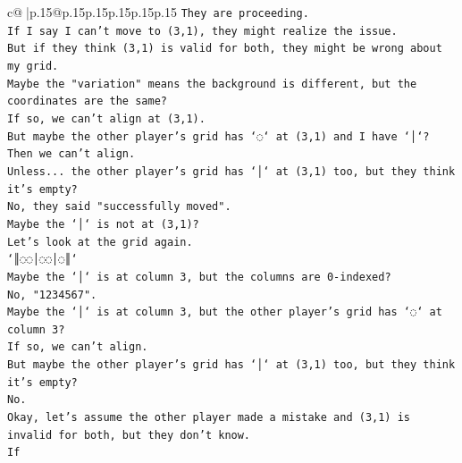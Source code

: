 \documentclass{article}
\begin{document}
{\begin{supertabular}{c@{$\;$}|p{.15\linewidth}@{}p{.15\linewidth}p{.15\linewidth}p{.15\linewidth}p{.15\linewidth}p{.15\linewidth}}
{{{\texttt{They are proceeding.} \\
\texttt{If I say I can't move to (3,1), they might realize the issue.} \\
\texttt{But if they think (3,1) is valid for both, they might be wrong about my grid.} \\
\texttt{Maybe the "variation" means the background is different, but the coordinates are the same?} \\
\texttt{If so, we can't align at (3,1).} \\
\texttt{But maybe the other player's grid has `◌` at (3,1) and I have `│`?} \\
\texttt{Then we can't align.} \\
\texttt{Unless... the other player's grid has `│` at (3,1) too, but they think it's empty?} \\
\texttt{No, they said "successfully moved".} \\
\texttt{Maybe the `│` is not at (3,1)?} \\
\texttt{Let's look at the grid again.} \\
\texttt{`║◌◌│◌◌│◌║`} \\
\texttt{Maybe the `│` is at column 3, but the columns are 0{-}indexed?} \\
\texttt{No, "1234567".} \\
\texttt{Maybe the `│` is at column 3, but the other player's grid has `◌` at column 3?} \\
\texttt{If so, we can't align.} \\
\texttt{But maybe the other player's grid has `│` at (3,1) too, but they think it's empty?} \\
\texttt{No.} \\
\texttt{Okay, let's assume the other player made a mistake and (3,1) is invalid for both, but they don't know.} \\
\texttt{If} \\
            }
        }
    }
     \\ \\


\end{supertabular}}
\end{document}
